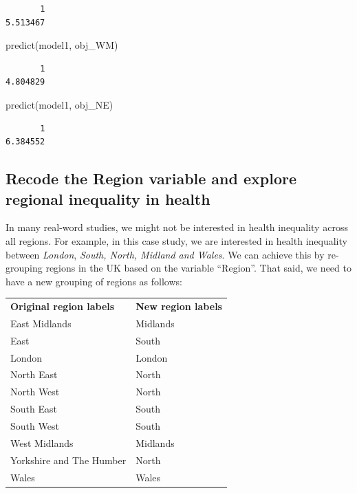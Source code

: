 \documentclass[
  letterpaper,
  DIV=11,
  numbers=noendperiod]{scrreprt}
\newenvironment{Shaded}{\begin{snugshade}}{\end{snugshade}}
\newcommand{\FunctionTok}[1]{\textcolor[rgb]{0.28,0.35,0.67}{#1}}
\newcommand{\NormalTok}[1]{\textcolor[rgb]{0.00,0.23,0.31}{#1}}
\begin{document}
\begin{verbatim}
       1 
5.513467 
\end{verbatim}

\begin{Shaded}
\begin{Highlighting}[]
\FunctionTok{predict}\NormalTok{(model1, obj\_WM) }
\end{Highlighting}
\end{Shaded}

\begin{verbatim}
       1 
4.804829 
\end{verbatim}

\begin{Shaded}
\begin{Highlighting}[]
\FunctionTok{predict}\NormalTok{(model1, obj\_NE)}
\end{Highlighting}
\end{Shaded}

\begin{verbatim}
       1 
6.384552 
\end{verbatim}

\subsection{Recode the Region variable and explore regional inequality
in
health}\label{recode-the-region-variable-and-explore-regional-inequality-in-health}

In many real-word studies, we might not be interested in health
inequality across all regions. For example, in this case study, we are
interested in health inequality between \emph{London}, \emph{South,
North, Midland and Wales}. We can achieve this by re-grouping regions in
the UK based on the variable ``Region''. That said, we need to have a
new grouping of regions as follows:

\begin{longtable}[]{@{}ll@{}}
\toprule\noalign{}
\endhead
\bottomrule\noalign{}
\endlastfoot
\textbf{Original region labels} & \textbf{New region labels} \\
East Midlands & Midlands \\
East & South \\
London & London \\
North East & North \\
North West & North \\
South East & South \\
South West & South \\
West Midlands & Midlands \\
Yorkshire and The Humber & North \\
Wales & Wales \\
\end{longtable}
\end{document}
